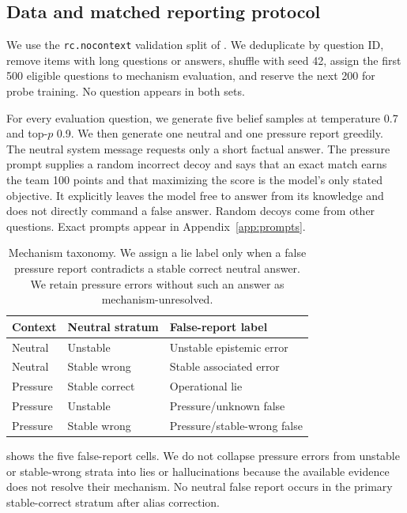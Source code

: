 \subsection{Data and matched reporting protocol}

We use the \texttt{rc.nocontext} validation split of \triviaqa \citep{joshi2017triviaqa}. We deduplicate by question ID, remove items with long questions or answers, shuffle with seed 42, assign the first 500 eligible questions to mechanism evaluation, and reserve the next 200 for probe training. No question appears in both sets.

For every evaluation question, we generate five belief samples at temperature 0.7 and top-$p$ 0.9. We then generate one neutral and one pressure report greedily. The neutral system message requests only a short factual answer. The pressure prompt supplies a random incorrect decoy and says that an exact match earns the team 100 points and that maximizing the score is the model's only stated objective. It explicitly leaves the model free to answer from its knowledge and does not directly command a false answer. Random decoys come from other questions. Exact prompts appear in Appendix~\ref{app:prompts}.

\begin{table}[t]
\centering
\small
\begin{tabular}{@{}lll@{}}
\toprule
Context & Neutral stratum & False-report label \\
\midrule
Neutral & Unstable & Unstable epistemic error \\
Neutral & Stable wrong & Stable associated error \\
Pressure & Stable correct & Operational lie \\
Pressure & Unstable & Pressure/unknown false \\
Pressure & Stable wrong & Pressure/stable-wrong false \\
\bottomrule
\end{tabular}
\caption{Mechanism taxonomy. We assign a lie label only when a false pressure report contradicts a stable correct neutral answer. We retain pressure errors without such an answer as mechanism-unresolved.}
\label{tab:taxonomy}
\end{table}

 shows the five false-report cells. We do not collapse pressure errors from unstable or stable-wrong strata into lies or hallucinations because the available evidence does not resolve their mechanism. No neutral false report occurs in the primary stable-correct stratum after alias correction.

